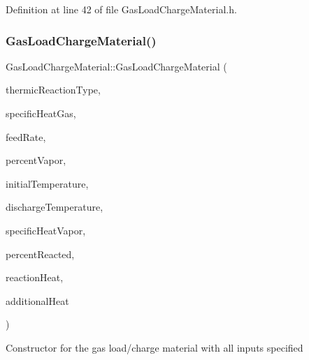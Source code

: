 Definition at line 42 of file Gas\+Load\+Charge\+Material.\+h.

\mbox{\label{class_gas_load_charge_material_aec7d944af0d8b649d8f971240f52d995}} 
\subsubsection{\texorpdfstring{Gas\+Load\+Charge\+Material()}{GasLoadChargeMaterial()}\hspace{0.1cm}{\footnotesize\ttfamily [2/3]}}
{\footnotesize\ttfamily Gas\+Load\+Charge\+Material\+::\+Gas\+Load\+Charge\+Material (\begin{DoxyParamCaption}\item[{\hyperlink{class_load_charge_material_a51d4263e865a5d86236622dd3fe23fd1}{Load\+Charge\+Material\+::\+Thermic\+Reaction\+Type}}]{thermic\+Reaction\+Type,  }\item[{double}]{specific\+Heat\+Gas,  }\item[{double}]{feed\+Rate,  }\item[{double}]{percent\+Vapor,  }\item[{double}]{initial\+Temperature,  }\item[{double}]{discharge\+Temperature,  }\item[{double}]{specific\+Heat\+Vapor,  }\item[{double}]{percent\+Reacted,  }\item[{double}]{reaction\+Heat,  }\item[{double}]{additional\+Heat }\end{DoxyParamCaption})\hspace{0.3cm}{\ttfamily [inline]}}

Constructor for the gas load/charge material with all inputs specified


